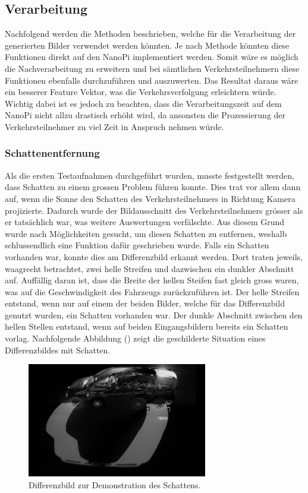 \subsection{Verarbeitung}
Nachfolgend werden die Methoden beschrieben, welche für die Verarbeitung der generierten Bilder verwendet werden könnten. Je nach Methode könnten diese Funktionen direkt auf den NanoPi implementiert werden. Somit wäre es möglich die Nachverarbeitung zu erweitern und bei sämtlichen Verkehrsteilnehmern diese Funktionen ebenfalls durchzuführen und auszuwerten. Das Resultat daraus wäre ein besserer Feature Vektor, was die Verkehrsverfolgung erleichtern würde. Wichtig dabei ist es jedoch zu beachten, dass die Verarbeitungszeit auf dem NanoPi nicht allzu drastisch erhöht wird, da ansonsten die Prozessierung der Verkehrsteilnehmer zu viel Zeit in Anspruch nehmen würde.

\subsubsection{Schattenentfernung}
Als die ersten Testaufnahmen durchgeführt wurden, musste festgestellt werden, dass Schatten zu einem grossen Problem führen konnte. Dies trat vor allem dann auf, wenn die Sonne den Schatten des Verkehrsteilnehmers in Richtung Kamera projizierte. Dadurch wurde der Bildausschnitt des Verkehrsteilnehmers grösser als er tatsächlich war, was weitere Auswertungen verfälschte. Aus diesem Grund wurde nach Möglichkeiten gesucht, um diesen Schatten zu entfernen, weshalb schlussendlich eine Funktion dafür geschrieben wurde.
Falls ein Schatten vorhanden war, konnte dies am Differenzbild erkannt werden. Dort traten jeweils, waagrecht betrachtet, zwei helle Streifen und dazwischen ein dunkler Abschnitt auf. Auffällig daran ist, dass die Breite der hellen Steifen fast gleich gross waren, was auf die Geschwindigkeit des Fahrzeugs zurückzuführen ist. Der helle Streifen entstand, wenn nur auf einem der beiden Bilder, welche für das Differenzbild genutzt wurden, ein Schatten vorhanden war. Der dunkle Abschnitt zwischen den hellen Stellen entstand, wenn auf beiden Eingangsbildern bereits ein Schatten vorlag. Nachfolgende Abbildung () zeigt die geschilderte Situation eines Differenzbildes mit Schatten.

\begin{figure}[H]
  \centering
  \includegraphics[width=0.7\textwidth]{Testversuche/BlurRemoveShadow.jpg} 
  \caption{Differenzbild zur Demonstration des Schattens.}
  \label{bBlurRemoveShadow}
\end{figure} 

